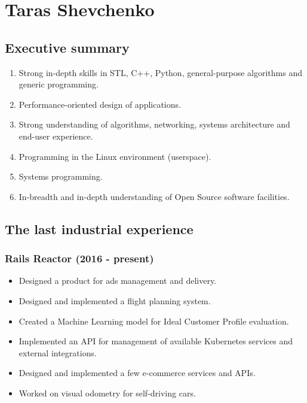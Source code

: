 \documentclass[a4paper,12pt,final]{extreport}
\begin{document}
\section{Taras Shevchenko}
\subsection{Executive summary}
\begin{enumerate}
  \item Strong in-depth skills in STL, C++, Python, general-purpose algorithms and generic programming.
  \item Performance-oriented design of applications.
  \item Strong understanding of algorithms, networking, systems architecture and end-user experience.
  \item Programming in the Linux environment (userspace).
  \item Systems programming.
  \item In-breadth and in-depth understanding of Open Source software facilities.
\end{enumerate}

\subsection{The last industrial experience}
\subsubsection{Rails Reactor (2016 - present)}
\begin{itemize}
  \item Designed a product for ads management and delivery.
  \item Designed and implemented a flight planning system.
  \item Created a Machine Learning model for Ideal Customer Profile evaluation.
  \item Implemented an API for management of available Kubernetes services and external integrations.
  \item Designed and implemented a few e-commerce services and APIs.
  \item Worked on visual odometry for self-driving cars.  
\end{itemize}
\end{document}
